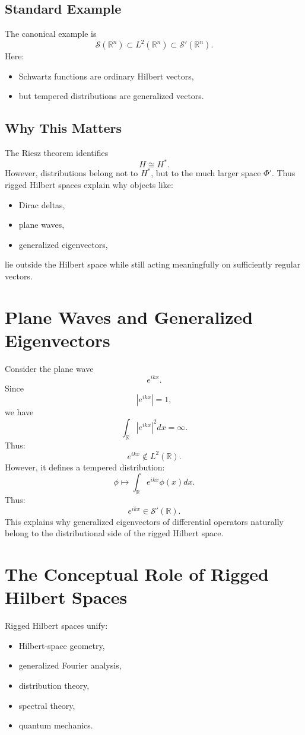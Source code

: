\documentclass[aps,prl,twocolumn,groupedaddress]{revtex4-2}
\begin{document}
\subsection{Standard Example}
The canonical example is 
\[
\mathcal{S}(\mathbb{R}^n) \subset L^2(\mathbb{R}^n) \subset \mathcal{S}'(\mathbb{R}^n).
\]
Here:
\begin{itemize}
\item Schwartz functions are ordinary Hilbert vectors,
\item but tempered distributions are generalized vectors.
\end{itemize}

\subsection{Why This Matters}
The Riesz theorem identifies 
\[
H \cong H^*.
\]
However, distributions belong not to $H^*$, but to the much larger space $\Phi'$. Thus rigged Hilbert spaces explain why objects like:
\begin{itemize}
\item Dirac deltas,
\item plane waves,
\item generalized eigenvectors,
\end{itemize}
lie outside the Hilbert space while still acting meaningfully on sufficiently regular vectors.



\section{Plane Waves and Generalized Eigenvectors}

Consider the plane wave 
\[
e^{ikx}.
\]
Since 
\[
|e^{ikx}| = 1,
\]
we have 
\[
\int_{\mathbb{R}} |e^{ikx}|^2 dx = \infty.
\]
Thus:
\[
e^{ikx} \notin L^2(\mathbb{R}).
\]
However, it defines a tempered distribution:
\[
\phi \mapsto \int_{\mathbb{R}} e^{ikx}\phi(x)dx.
\]
Thus:
\[
e^{ikx} \in \mathcal{S}'(\mathbb{R}).
\]
This explains why generalized eigenvectors of differential operators naturally belong to the distributional side of the rigged Hilbert space.



\section{The Conceptual Role of Rigged Hilbert Spaces}

Rigged Hilbert spaces unify:
\begin{itemize}
\item Hilbert-space geometry,
\item generalized Fourier analysis,
\item distribution theory,
\item spectral theory,
\item quantum mechanics.
\end{itemize}
\end{document}
